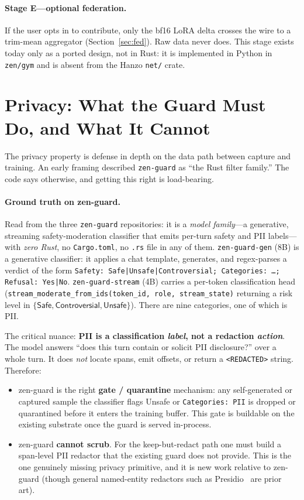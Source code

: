 \documentclass[11pt]{article}
\begin{document}
\paragraph{Stage E---optional federation.}
If the user opts in to contribute, only the bf16 LoRA delta crosses the wire to a trim-mean aggregator (Section~\ref{sec:fed}). Raw data never does. This stage exists today only as a ported design, not in Rust: it is implemented in Python in \texttt{zen/gym} and is absent from the Hanzo \texttt{net/} crate.

\section{Privacy: What the Guard Must Do, and What It Cannot}
\label{sec:privacy}

The privacy property is defense in depth on the data path between capture and training. An early framing described \texttt{zen-guard} as ``the Rust filter family.'' The code says otherwise, and getting this right is load-bearing.

\paragraph{Ground truth on zen-guard.}
Read from the three \texttt{zen-guard} repositories: it is a \emph{model family}---a generative, streaming safety-moderation classifier that emits per-turn safety and PII labels---with \emph{zero Rust}, no \texttt{Cargo.toml}, no \texttt{.rs} file in any of them. \texttt{zen-guard-gen} (8B) is a generative classifier: it applies a chat template, generates, and regex-parses a verdict of the form \texttt{Safety: Safe|Unsafe|Controversial; Categories: \ldots; Refusal: Yes|No}. \texttt{zen-guard-stream} (4B) carries a per-token classification head (\texttt{stream\_moderate\_from\_ids(token\_id, role, stream\_state)} returning a risk level in $\{\textsf{Safe}, \textsf{Controversial}, \textsf{Unsafe}\}$). There are nine categories, one of which is PII.

The critical nuance: \textbf{PII is a classification \emph{label}, not a redaction \emph{action}}. The model answers ``does this turn contain or solicit PII disclosure?'' over a whole turn. It does \emph{not} locate spans, emit offsets, or return a \texttt{<REDACTED>} string. Therefore:
\begin{itemize}
    \item zen-guard is the right \textbf{gate / quarantine} mechanism: any self-generated or captured sample the classifier flags \textsf{Unsafe} or \texttt{Categories: PII} is dropped or quarantined before it enters the training buffer. This gate is buildable on the existing substrate once the guard is served in-process.
    \item zen-guard \textbf{cannot scrub}. For the keep-but-redact path one must build a span-level PII redactor that the existing guard does not provide. This is the one genuinely missing privacy primitive, and it is new work relative to zen-guard (though general named-entity redactors such as Presidio~\cite{presidio} are prior art).
\end{itemize}
\end{document}
